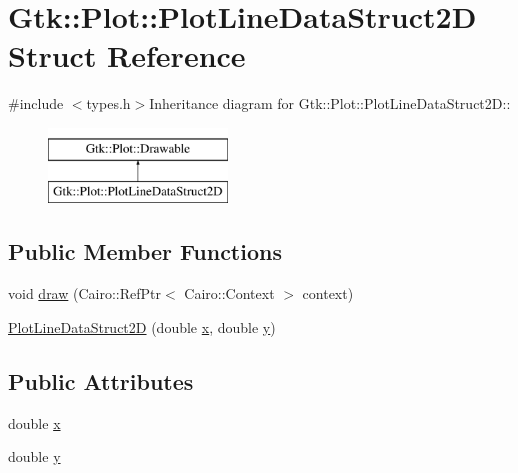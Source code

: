 \hypertarget{structGtk_1_1Plot_1_1PlotLineDataStruct2D}{
\section{Gtk::Plot::PlotLineDataStruct2D Struct Reference}
\label{structGtk_1_1Plot_1_1PlotLineDataStruct2D}
}


{\ttfamily \#include $<$types.h$>$}Inheritance diagram for Gtk::Plot::PlotLineDataStruct2D::\begin{figure}[H]
\begin{center}
\leavevmode
\includegraphics[height=2cm]{structGtk_1_1Plot_1_1PlotLineDataStruct2D}
\end{center}
\end{figure}
\subsection*{Public Member Functions}
\begin{DoxyCompactItemize}
\item 
void \hyperlink{structGtk_1_1Plot_1_1PlotLineDataStruct2D_ad3f4c1ed94cc37644032ac3be8995e1d}{draw} (Cairo::RefPtr$<$ Cairo::Context $>$ context)
\item 
\hyperlink{structGtk_1_1Plot_1_1PlotLineDataStruct2D_a3f2f9b4ec89a940baea3c1fd3e0da75e}{PlotLineDataStruct2D} (double \hyperlink{structGtk_1_1Plot_1_1PlotLineDataStruct2D_abc9c02f23c4bd8cdb29bc3c497ca121b}{x}, double \hyperlink{structGtk_1_1Plot_1_1PlotLineDataStruct2D_a9a13b8cff1bbb4428b1affe716379e0d}{y})
\end{DoxyCompactItemize}
\subsection*{Public Attributes}
\begin{DoxyCompactItemize}
\item 
double \hyperlink{structGtk_1_1Plot_1_1PlotLineDataStruct2D_abc9c02f23c4bd8cdb29bc3c497ca121b}{x}
\item 
double \hyperlink{structGtk_1_1Plot_1_1PlotLineDataStruct2D_a9a13b8cff1bbb4428b1affe716379e0d}{y}
\end{DoxyCompactItemize}


